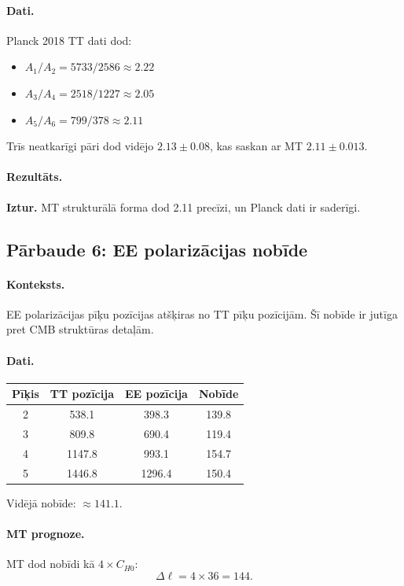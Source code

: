 \documentclass[12pt,a4paper]{article}
\begin{document}
\paragraph{Dati.}
Planck 2018 TT dati dod:
\begin{itemize}
    \item $A_1/A_2 = 5733/2586 \approx 2.22$
    \item $A_3/A_4 = 2518/1227 \approx 2.05$
    \item $A_5/A_6 = 799/378 \approx 2.11$
\end{itemize}
Trīs neatkarīgi pāri dod vidējo $2.13 \pm 0.08$, kas saskan ar MT $2.11 \pm 0.013$.

\paragraph{Rezultāts.}
\textbf{Iztur.} MT strukturālā forma dod 2.11 precīzi, un Planck dati ir saderīgi.

\subsection*{Pārbaude 6: EE polarizācijas nobīde}

\paragraph{Konteksts.}
EE polarizācijas pīķu pozīcijas atšķiras no TT pīķu pozīcijām. Šī nobīde ir jutīga pret CMB struktūras detaļām.

\paragraph{Dati.}
\begin{table}[h]
\centering
\begin{tabular}{|c|c|c|c|}
\hline
Pīķis & TT pozīcija & EE pozīcija & Nobīde \\
\hline
2 & 538.1 & 398.3 & 139.8 \\
3 & 809.8 & 690.4 & 119.4 \\
4 & 1147.8 & 993.1 & 154.7 \\
5 & 1446.8 & 1296.4 & 150.4 \\
\hline
\end{tabular}
\end{table}

Vidējā nobīde: $\approx 141.1$.

\paragraph{MT prognoze.}
MT dod nobīdi kā $4 \times C_{H0}$:
\[
\Delta\ell = 4 \times 36 = 144.
\]
\end{document}
